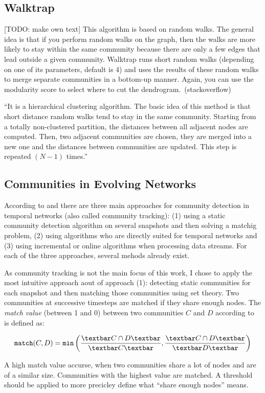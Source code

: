 \subsection{Walktrap}
[TODO: make own text]
This algorithm is based on random walks. The general idea is that if you perform random walks on the graph, then the walks are more likely to stay within the same community because there are only a few edges that lead outside a given community. Walktrap runs short random walks (depending on one of its parameters, default is 4) and uses the results of these random walks to merge separate communities in a bottom-up manner. Again, you can use the modularity score to select where to cut the dendrogram.~(stackoverflow)

``It is a hierarchical clustering algorithm. The basic idea of this method is that short distance random walks tend to stay in the same community. Starting from a totally non-clustered partition, the distances between all adjacent nodes are computed. Then, two adjacent communities are chosen, they are merged into a new one and the distances between communities are updated. This step is repeated $(N - 1)$ times.''~\cite{yang2016comparative}

\subsection{Communities in Evolving Networks}
\label{sec:bg:tracking}
According to \textcite{aynaud2013communities} and \textcite{brodka2014community} there are three main approaches for community detection in temporal networks (also called community tracking): (1) using a static community detection algorithm on several snapshots and then solving a matchig problem, (2) using algorithms who are directly suited for temporal networks and (3) using incremental or online algorithms when processing data streams. For each of the three approaches, several mehods already exist.

As community tracking is not the main focus of this work, I chose to apply the most intuitive approach aout of approach (1): detecting static communities for each snapshot and then matching those communities using set theory.  Two communities at successive timesteps are matched if they share enough nodes. The \emph{match value} (between 1 and 0) between two communities $C$ and $D$ according to~\cite{hopcroft2004tracking} is defined as:

\begin{equation}
\label{eq:match}
\texttt{match}(C,D) = \texttt{min}\left( \frac{\textbar C\cap D \textbar}{\textbar C\textbar }, \frac{\textbar C\cap D \textbar}{\textbar D \textbar }\right)
\end{equation}

A high match value accurse, when two communities share a lot of nodes and are of a similar size. Communities with the highest value are matched. A threshold should be applied to more precicley define what ``share enough nodes'' means.

